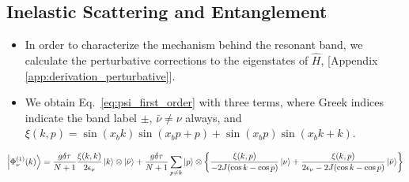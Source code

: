 \documentclass[10pt,
 amsmath,amssymb,
 aps,prb, twocolumn
]{revtex4-2}
\begin{document}
\subsection{Inelastic Scattering and Entanglement}\label{sect:entanglement}

\begin{itemize}
    \item  In order to characterize the mechanism behind the resonant band, we calculate the perturbative corrections to the eigenstates of $\hat{H}$, [Appendix \ref{app:derivation_perturbative}].

    \item We obtain Eq.~\eqref{eq:psi_first_order} with three terms, where  Greek indices indicate the band label \mbox{$\pm$}, \mbox{$\bar{\nu} \neq \nu$} always, and \mbox{$\xi(k,p) = \sin{(x_bk)}\sin{(x_b p+p)}+\sin{(x_b p)}\sin{(x_b k+k)}$}.   
\end{itemize}

\begin{widetext}
\begin{equation}
    \ket{\Phi_\nu^{(1)} (k)} = \frac{g\delta\tau}{N+1} \frac{\xi(k,k)}{2\epsilon_\nu} \ket{k} \otimes \ket{\bar{\nu}}+\frac{g\delta\tau}{N+1} \sum_{p \neq k} \ket{p} \otimes \left\{\frac{\xi(k,p)}{-2J(\cos k - \cos p)} \ket{\nu} + \frac{\xi(k,p)}{2\epsilon_\nu - 2J(\cos k - \cos p)} \ket{\bar{\nu}} \right\} \label{eq:psi_first_order}
\end{equation}
\end{widetext}
\end{document}
